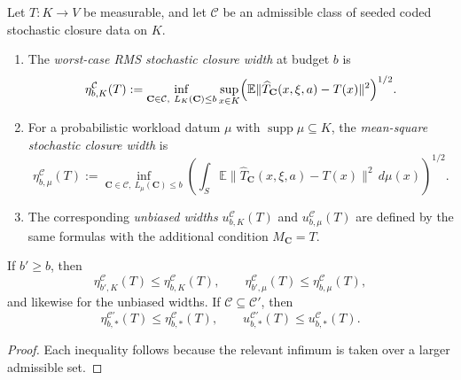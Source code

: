 \begin{definition}
\label{def:stochastic-closure-widths}
Let \(T:K\to V\) be measurable, and let \(\mathcal C\) be an admissible class
of seeded coded stochastic closure data on \(K\).
\begin{enumerate}[label=(\roman*), leftmargin=2em, itemsep=0.2em]
\item The \emph{worst-case RMS stochastic closure width} at budget \(b\) is
      \[
      \eta^{\mathcal C}_{b,K}(T)
      :=
      \inf_{\mathbf C\in\mathcal C,\ L_K(\mathbf C)\le b}
      \sup_{x\in K}
      \Bigl(
      \mathbb E\|\widehat T_{\mathbf C}(x,\xi,a)-T(x)\|^2
      \Bigr)^{1/2}.
      \]
\item For a probabilistic workload datum \(\mu\) with
      \(\operatorname{supp}\mu\subseteq K\), the
      \emph{mean-square stochastic closure width} is
      \[
      \eta^{\mathcal C}_{b,\mu}(T)
      :=
      \inf_{\mathbf C\in\mathcal C,\ L_{\mu}(\mathbf C)\le b}
      \left(
      \int_S
      \mathbb E\|\widehat T_{\mathbf C}(x,\xi,a)-T(x)\|^2\,d\mu(x)
      \right)^{1/2}.
      \]
\item The corresponding \emph{unbiased widths}
      \(u^{\mathcal C}_{b,K}(T)\) and \(u^{\mathcal C}_{b,\mu}(T)\) are defined
      by the same formulas with the additional condition \(M_{\mathbf C}=T\).
\end{enumerate}
\end{definition}

\begin{proposition}
\label{prop:stochastic-width-monotonicity}
If \(b'\ge b\), then
\[
\eta^{\mathcal C}_{b',K}(T)\le \eta^{\mathcal C}_{b,K}(T),
\qquad
\eta^{\mathcal C}_{b',\mu}(T)\le \eta^{\mathcal C}_{b,\mu}(T),
\]
and likewise for the unbiased widths. If \(\mathcal C\subseteq \mathcal C'\),
then
\[
\eta^{\mathcal C'}_{b,*}(T)\le \eta^{\mathcal C}_{b,*}(T),
\qquad
u^{\mathcal C'}_{b,*}(T)\le u^{\mathcal C}_{b,*}(T).
\]
\end{proposition}

\begin{proof}
Each inequality follows because the relevant infimum is taken over a larger
admissible set.
\end{proof}

